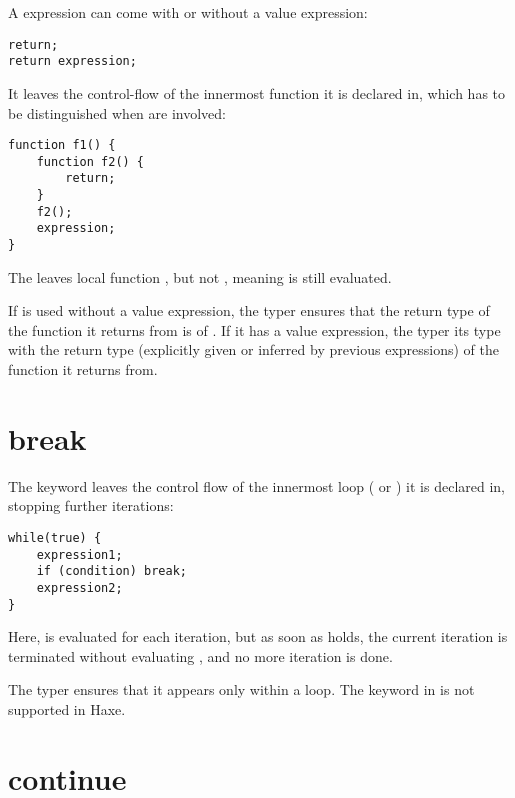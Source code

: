 A  expression can come with or without a value expression:

\begin{lstlisting}
return;
return expression;
\end{lstlisting}

It leaves the control-flow of the innermost function it is declared in, which has to be distinguished when  are involved:

\begin{lstlisting}
function f1() {
	function f2() {
		return;
	}
	f2();
	expression;
}
\end{lstlisting}

The  leaves local function , but not , meaning  is still evaluated.

If  is used without a value expression, the typer ensures that the return type of the function it returns from is of . If it has a value expression, the typer  its type with the return type (explicitly given or inferred by previous  expressions) of the function it returns from.


\section{break}
\label{expression-break}

The  keyword leaves the control flow of the innermost loop ( or ) it is declared in, stopping further iterations:

\begin{lstlisting}
while(true) {
	expression1;
	if (condition) break;
	expression2;
}
\end{lstlisting}

Here,  is evaluated for each iteration, but as soon as  holds, the current iteration is terminated without evaluating , and no more iteration is done.

The typer ensures that it appears only within a loop. The  keyword in  is not supported in Haxe.


\section{continue}
\label{expression-continue}

